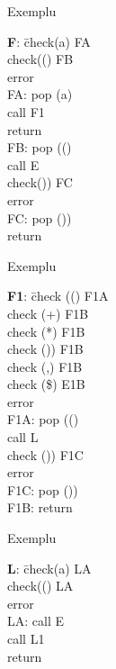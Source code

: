 \documentclass[pdf]{beamer}
\begin{document}
\begin{frame}{Exemplu}
\begin{tabbing}
\textbf{F}: \= check(a) FA\\
            \> check(() FB\\
            \> error\\
FA: pop (a)\\
    \> call F1\\
    \> return\\
FB: pop (()\\
    \> call E\\
    \> check()) FC\\
    \> error\\
FC: pop ())\\
    \> return\\
\end{tabbing}
\end{frame}



\begin{frame}{Exemplu}
\begin{tabbing}
\textbf{F1}: \= check (() F1A\\
             \> check (+) F1B\\
             \> check (*) F1B\\
             \> check ()) F1B\\
             \> check (,) F1B\\
             \> check (\$) E1B\\
             \> error\\
F1A: pop (()\\
     \> call L\\
     \> check ()) F1C\\
     \> error \\     
F1C: pop ())\\
F1B: return\\
\end{tabbing}
\end{frame}



\begin{frame}{Exemplu}
\begin{tabbing}
\textbf{L}: \= check(a) LA\\
            \> check(() LA\\
            \> error\\
LA: call E\\
    \> call L1\\
    \> return\\
\end{tabbing}
\end{frame}
\end{document}
